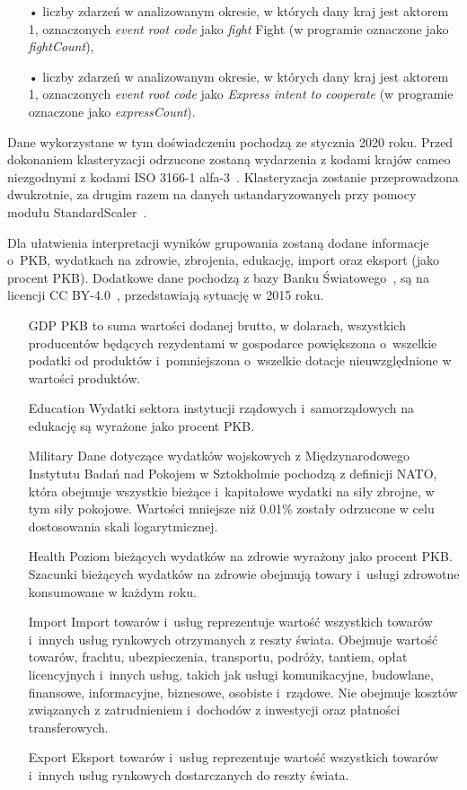 \documentclass[11pt]{report}
\begin{document}
\begin{enumerate}
        \item[•] liczby zdarzeń w analizowanym okresie, w których dany kraj jest aktorem 1, oznaczonych \textit{event root code} jako \textit{fight} Fight (w programie oznaczone jako \textit{fightCount}),
        \item[•] liczby zdarzeń w analizowanym okresie, w których dany kraj jest aktorem 1, oznaczonych \textit{event root code} jako \textit{Express intent to cooperate}  (w programie oznaczone jako \textit{expressCount}).
    \end{enumerate}
    Dane wykorzystane w tym doświadczeniu pochodzą ze stycznia 2020 roku.
    Przed dokonaniem klasteryzacji odrzucone zostaną wydarzenia z kodami krajów cameo niezgodnymi z kodami ISO 3166-1 alfa-3~\cite{iso_alfa3}.
    Klasteryzacja zostanie przeprowadzona dwukrotnie, za drugim razem na danych ustandaryzowanych przy pomocy modułu StandardScaler~\cite{standardScaler}.

    Dla ułatwienia interpretacji wyników grupowania zostaną dodane informacje o~PKB, wydatkach na zdrowie, zbrojenia, edukację, import oraz eksport (jako procent PKB).
    Dodatkowe dane pochodzą z bazy Banku Światowego~\cite{worldbank}, są na licencji CC BY-4.0~\cite{wblicense}, przedstawiają sytuację w 2015 roku.
    \begin{enumerate}
        \item[GDP] PKB to suma wartości dodanej brutto, w dolarach, wszystkich producentów będących rezydentami w gospodarce powiększona o~wszelkie podatki od produktów i~pomniejszona o~wszelkie dotacje nieuwzględnione w wartości produktów.
        \item[Education] Wydatki sektora instytucji rządowych i~samorządowych na edukację są wyrażone jako procent PKB.
        \item[Military] Dane dotyczące wydatków wojskowych z Międzynarodowego Instytutu Badań nad Pokojem w Sztokholmie pochodzą z definicji NATO, która obejmuje wszystkie bieżące i~kapitałowe wydatki na siły zbrojne, w tym siły pokojowe.
        Wartości mniejsze niż 0.01\% zostały odrzucone w celu dostosowania skali logarytmicznej.
        \item[Health] Poziom bieżących wydatków na zdrowie wyrażony jako procent PKB. Szacunki bieżących wydatków na zdrowie obejmują towary i~usługi zdrowotne konsumowane w każdym roku.
        \item[Import] Import towarów i~usług reprezentuje wartość wszystkich towarów i~innych usług rynkowych otrzymanych z reszty świata.
        Obejmuje wartość towarów, frachtu, ubezpieczenia, transportu, podróży, tantiem, opłat licencyjnych i~innych usług, takich jak usługi komunikacyjne, budowlane, finansowe, informacyjne, biznesowe, osobiste i~rządowe.
        Nie obejmuje kosztów związanych z zatrudnieniem i~dochodów z inwestycji oraz płatności transferowych.
        \item[Export] Eksport towarów i~usług reprezentuje wartość wszystkich towarów i~innych usług rynkowych dostarczanych do reszty świata.
    \end{enumerate}
\end{document}
